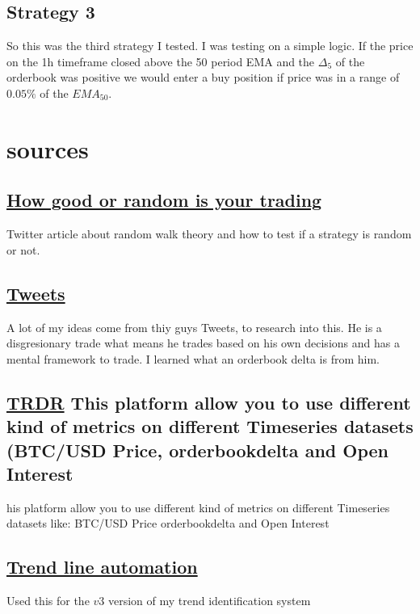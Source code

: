 \documentclass[12pt]{article}
\begin{document}
\newpage
\subsection{Strategy 3}
So this was the third strategy I tested. I was testing on a simple logic. If the price on the 1h timeframe closed above the 50 period EMA and the $\Delta_5$ of the orderbook was positive we would enter a buy position if price was in a range of $0.05\%$ of the $EMA_50$.







\newpage
\section{sources}
{\small
\subsection{\href{https://x.com/HangukQuant/status/1930603876069335120}{How good or random is your trading}}
Twitter article about random walk theory and how to test if a strategy is random or not. 
\subsection{\href{https://x.com/abetrade/status/1941613701150188008}{Tweets}}
A lot of my ideas come from thiy guys Tweets, to research into this. He is a disgresionary trade what means he trades based on his own decisions and has a mental framework to trade. I learned what an orderbook delta is from him.
\subsection{\href{https://trdr.io/}{TRDR} This platform allow you to use different kind of metrics on different Timeseries datasets (BTC/USD Price, orderbookdelta  and Open Interest}his platform allow you to use different kind of metrics on different Timeseries datasets like: BTC/USD Price orderbookdelta  and Open Interest
\subsection{\href{https://github.com/neurotrader888/TrendLineAutomation}{Trend line automation}} Used this for the $v3$ version of my trend identification system
}
\end{document}
